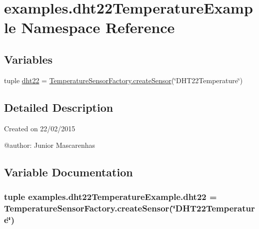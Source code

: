 \hypertarget{namespaceexamples_1_1dht22TemperatureExample}{}\section{examples.\+dht22\+Temperature\+Example Namespace Reference}
\label{namespaceexamples_1_1dht22TemperatureExample}
\subsection*{Variables}
\begin{DoxyCompactItemize}
\item 
tuple \hyperlink{namespaceexamples_1_1dht22TemperatureExample_a8a7cfaafa6635e944bbb572f9005f5b9}{dht22} = \hyperlink{classconcretefactory_1_1temperatureSensorFactory_1_1TemperatureSensorFactory_a10da40452b9fced7f217c6716e8d5ecc}{Temperature\+Sensor\+Factory.\+create\+Sensor}(\char`\"{}D\+H\+T22\+Temperature\char`\"{})
\end{DoxyCompactItemize}


\subsection{Detailed Description}
\begin{DoxyVerb}Created on 22/02/2015

@author: Junior Mascarenhas
\end{DoxyVerb}
 

\subsection{Variable Documentation}
\hypertarget{namespaceexamples_1_1dht22TemperatureExample_a8a7cfaafa6635e944bbb572f9005f5b9}{}
\subsubsection[{dht22}]{\setlength{\rightskip}{0pt plus 5cm}tuple examples.\+dht22\+Temperature\+Example.\+dht22 = {\bf Temperature\+Sensor\+Factory.\+create\+Sensor}(\char`\"{}D\+H\+T22\+Temperature\char`\"{})}\label{namespaceexamples_1_1dht22TemperatureExample_a8a7cfaafa6635e944bbb572f9005f5b9}
